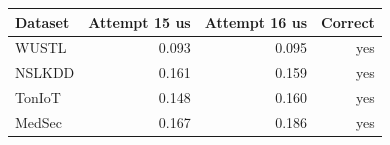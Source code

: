 \begin{tabular}{lrrr}
\toprule
Dataset & Attempt 15 us & Attempt 16 us & Correct \\
\midrule
WUSTL & 0.093 & 0.095 & yes \\
NSLKDD & 0.161 & 0.159 & yes \\
TonIoT & 0.148 & 0.160 & yes \\
MedSec & 0.167 & 0.186 & yes \\
\bottomrule
\end{tabular}
